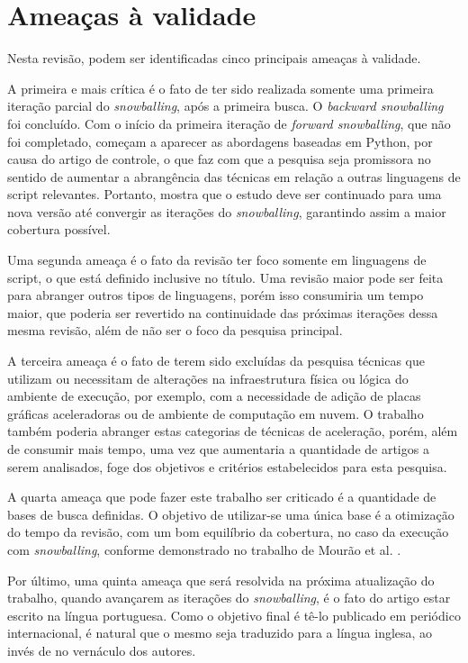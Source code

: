 \documentclass[sigconf]{acmart}
\begin{document}
\section{Ameaças à validade}
Nesta revisão, podem ser identificadas cinco principais ameaças à validade.

A primeira e mais crítica é o fato de ter sido realizada somente uma primeira iteração parcial do \textit{snowballing}, após a primeira busca. O \textit{backward snowballing} foi concluído. Com o início da primeira iteração de \textit{forward snowballing}, que não foi completado, começam a aparecer as abordagens baseadas em Python, por causa do artigo de controle, o que faz com que a pesquisa seja promissora no sentido de aumentar a abrangência das técnicas em relação a outras linguagens de script relevantes. Portanto, mostra que o estudo deve ser continuado para uma nova versão até convergir as iterações do \textit{snowballing}, garantindo assim a maior cobertura possível.

Uma segunda ameaça é o fato da revisão ter foco somente em linguagens de script, o que está definido inclusive no título. Uma revisão maior pode ser feita para abranger outros tipos de linguagens, porém isso consumiria um tempo maior, que poderia ser revertido na continuidade das próximas iterações dessa mesma revisão, além de não ser o foco da pesquisa principal.

A terceira ameaça é o fato de terem sido excluídas da pesquisa técnicas que utilizam ou necessitam de alterações na infraestrutura física ou lógica do ambiente de execução, por exemplo, com a necessidade de adição de placas gráficas aceleradoras ou de ambiente de computação em nuvem. O trabalho também poderia abranger estas categorias de técnicas de aceleração, porém, além de consumir mais tempo, uma vez que aumentaria a quantidade de artigos a serem analisados, foge dos objetivos e critérios estabelecidos para esta pesquisa. 

A quarta ameaça que pode fazer este trabalho ser criticado é a quantidade de bases de busca definidas. O objetivo de utilizar-se uma única base é a otimização do tempo da revisão, com um bom equilíbrio da cobertura, no caso da execução com \textit{snowballing}, conforme demonstrado no trabalho de Mourão et al. \cite{mourao2020performance}.

Por último, uma quinta ameaça que será resolvida na próxima atualização do trabalho, quando avançarem as iterações do \textit{snowballing}, é o fato do artigo estar escrito na língua portuguesa. Como o objetivo final é tê-lo publicado em periódico internacional, é natural que o mesmo seja traduzido para a língua inglesa, ao invés de no vernáculo dos autores.
\end{document}
